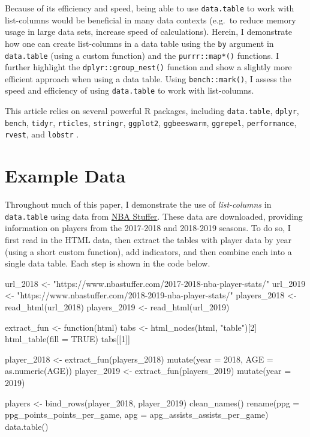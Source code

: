 Because of its efficiency and speed, being able to use
\texttt{data.table} to work with list-columns would be beneficial in
many data contexts (e.g.~to reduce memory usage in large data sets,
increase speed of calculations). Herein, I demonstrate how one can
create list-columns in a data table using the \texttt{by} argument in
\texttt{data.table} (using a custom function) and the
\texttt{purrr::map*()} functions. I further highlight the
\texttt{dplyr::group\_nest()} function and show a slightly more
efficient approach when using a data table. Using
\texttt{bench::mark()}, I assess the speed and efficiency of using
\texttt{data.table} to work with list-columns.

This article relies on several powerful R packages, including
\texttt{data.table}, \texttt{dplyr}, \texttt{bench}, \texttt{tidyr},
\texttt{rticles}, \texttt{stringr}, \texttt{ggplot2},
\texttt{ggbeeswarm}, \texttt{ggrepel}, \texttt{performance},
\texttt{rvest}, and \texttt{lobstr}
\citep{R-data.table,R-dplyr,R-bench,R-tidyr,R-rticles,R-stringr,R-ggbeeswarm,R-ggrepel,R-ggplot2,R-rvest,R-performance,R-lobstr}.

\hypertarget{example-data}{%
\section{Example Data}\label{example-data}}

Throughout much of this paper, I demonstrate the use of
\emph{list-columns} in \texttt{data.table} using data from
\href{nbastuffer.com}{NBA Stuffer}. These data are downloaded, providing
information on players from the 2017-2018 and 2018-2019 seasons. To do
so, I first read in the HTML data, then extract the tables with player
data by year (using a short custom function), add indicators, and then
combine each into a single data table. Each step is shown in the code
below.

\begin{Schunk}
\begin{Sinput}
url_2018 <- "https://www.nbastuffer.com/2017-2018-nba-player-stats/"
url_2019 <- "https://www.nbastuffer.com/2018-2019-nba-player-stats/"
players_2018 <- read_html(url_2018)
players_2019 <- read_html(url_2019)

extract_fun <- function(html){
  tabs <- html_nodes(html, "table")[2] %
    html_table(fill = TRUE)
  tabs[[1]] 
}

player_2018 <- 
  extract_fun(players_2018) %
  mutate(year = 2018,
         AGE = as.numeric(AGE))
player_2019 <- 
  extract_fun(players_2019) %
  mutate(year = 2019)

players <- 
  bind_rows(player_2018, player_2019) %
  clean_names() %
  rename(ppg = ppg_points_points_per_game,
         apg = apg_assists_assists_per_game) %
  data.table()
\end{Sinput}
\end{Schunk}

